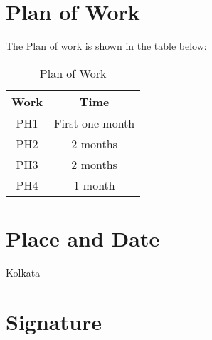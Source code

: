 \documentclass[margin, centered]{res}
\begin{document}
\begin{resume}
\begin{table}[ht]
\begin{tabular}{c c c c c}
\end{tabular}
\end{table}

\section{Plan of Work} The Plan of work is shown in the table below:

\begin{table}[ht]
\caption{Plan of Work}
\centering
\begin{tabular}{c c}
\hline \hline
Work & Time \\
\hline
PH1 & First one month\\
PH2 & 2 months\\
PH3 & 2 months\\
PH4 & 1 month\\

\end{tabular}
\end{table}

\section{Place and Date} Kolkata

\section{Signature}

\end{resume}
\end{document}
